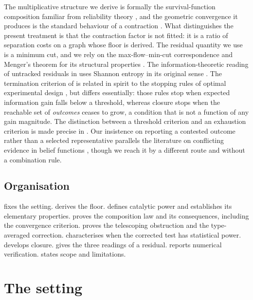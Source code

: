 \documentclass[11pt,a4paper]{article}
\theoremstyle{thmstyle}
\theoremstyle{definition}
\theoremstyle{remark}
\begin{document}
The multiplicative structure we derive is formally the survival-function
composition familiar from reliability theory \citep{barlow1975}, and the
geometric convergence it produces is the standard behaviour of a contraction
\citep{banach1922}. What distinguishes the present treatment is that the
contraction factor is not fitted: it is a ratio of separation costs on a
graph whose floor is derived. The residual quantity we use is a minimum cut,
and we rely on the max-flow--min-cut correspondence and Menger's theorem for
its structural properties \citep{menger1927,fordfulkerson1956}. The
information-theoretic reading of untracked residuals in
 uses Shannon entropy in its original sense
\citep{shannon1948,cover2006}. The termination criterion of
 is related in spirit to the stopping rules of optimal
experimental design \citep{lindley1956,chaloner1995}, but differs
essentially: those rules stop when expected information gain falls below a
threshold, whereas closure stops when the reachable set of \emph{outcomes}
ceases to grow, a condition that is not a function of any gain magnitude.
The distinction between a threshold criterion and an exhaustion criterion is
made precise in . Our insistence on reporting a
contested outcome rather than a selected representative parallels the
literature on conflicting evidence in belief functions
\citep{dempster1967,shafer1976}, though we reach it by a different route and
without a combination rule.

\subsection{Organisation}

 fixes the setting.  derives the floor.
 defines catalytic power and establishes its elementary
properties.  proves the composition law and its
consequences, including the convergence criterion.
 proves the telescoping obstruction and the
type-averaged correction.  characterises when the
corrected test has statistical power.  develops closure.
 gives the three readings of a residual.
 reports numerical verification.
 states scope and limitations.

\section{The setting}
\label{sec:setting}
\end{document}
